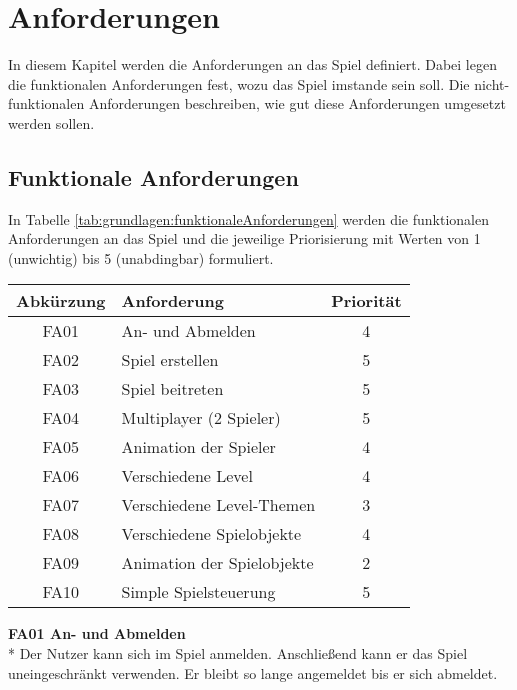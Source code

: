 \chapter{Anforderungen}
\label{cha:anforderungen}
In diesem Kapitel werden die Anforderungen an das Spiel definiert. Dabei legen die funktionalen Anforderungen fest, wozu das Spiel imstande sein soll. Die nicht-funktionalen Anforderungen beschreiben, wie gut diese Anforderungen umgesetzt werden sollen.

\section{Funktionale Anforderungen}
\label{sec:grundlagen:funktionaleAnforderungen}
In Tabelle \ref{tab:grundlagen:funktionaleAnforderungen} werden die funktionalen Anforderungen an das Spiel und die jeweilige Priorisierung mit Werten von 1 (unwichtig) bis 5 (unabdingbar) formuliert.

\begin{center}
    \label{tab:grundlagen:funktionaleAnforderungen}
    \begin{tabular}{ c | l | c}
        Abkürzung & Anforderung & Priorität\\
        \hline
        FA01 & An- und Abmelden & 4 \\
        \hline
        FA02 & Spiel erstellen & 5 \\
        \hline
        FA03 & Spiel beitreten & 5 \\
        \hline
        FA04 & Multiplayer (2 Spieler) & 5 \\
        \hline
        FA05 & Animation der Spieler & 4 \\
        \hline
        FA06 & Verschiedene Level & 4 \\
        \hline
        FA07 & Verschiedene Level-Themen & 3 \\
        \hline
        FA08 & Verschiedene Spielobjekte & 4 \\
        \hline
        FA09 & Animation der Spielobjekte & 2 \\
        \hline
        FA10 & Simple Spielsteuerung & 5 \\
    \end{tabular}
\end{center}

\textbf{FA01 An- und Abmelden}\\*
Der Nutzer kann sich im Spiel anmelden. Anschließend kann er das Spiel uneingeschränkt verwenden. Er bleibt so lange angemeldet bis er sich abmeldet.

